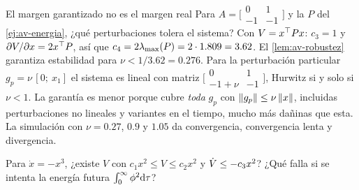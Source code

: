 \begin{ejemplo}[label=ej:av-robustez]{El margen garantizado no es el margen real}
Para $A=\bigl[\begin{smallmatrix}0&1\\-1&-1\end{smallmatrix}\bigr]$ y la $P$ del \cref{ej:av-energia}, ¿qué perturbaciones tolera el sistema?
\solucion Con $V=x^{\top} Px$: $c_3=1$ y $\partial V/\partial x=2x^{\top} P$, así que $c_4=2\lambda_{\max}(P)=2\cdot1.809=3.62$. El \cref{lem:av-robustez} garantiza estabilidad para $\nu<1/3.62=0.276$. Para la perturbación particular $g_p=\nu\,[0;\ x_1]$ el sistema es lineal con matriz $\bigl[\begin{smallmatrix}0&1\\-1+\nu&-1\end{smallmatrix}\bigr]$, Hurwitz si y solo si $\nu<1$. La garantía es menor porque cubre \emph{toda} $g_p$ con $\left\lVert g_p\right\rVert\le\nu\left\lVert x\right\rVert$, incluidas perturbaciones no lineales y variantes en el tiempo, mucho más dañinas que esta. La simulación con $\nu=0.27$, $0.9$ y $1.05$ da convergencia, convergencia lenta y divergencia.
\end{ejemplo}


\begin{pausa}
Para $\dot x=-x^3$, ¿existe $V$ con $c_1x^2\le V\le c_2x^2$ y $\dot V\le-c_3x^2$? ¿Qué falla si se intenta la energía futura $\int_0^\infty\phi^2\mathrm{d}\tau$?
\end{pausa}
